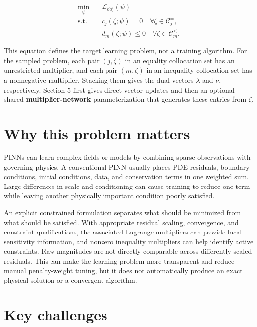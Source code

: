 \documentclass[a4paper]{article}
\begin{document}
\begin{equation}
\begin{aligned}
\min_{\psi}\quad
&\mathcal L_{\mathrm{obj}}(\psi)\\
\mathrm{s.t.}\quad
&c_j(\zeta;\psi)=0
\quad \forall\zeta\in\mathcal C_j^{=},\\
&d_m(\zeta;\psi)\le0
\quad \forall\zeta\in\mathcal C_m^{\le}.
\end{aligned}
\end{equation}

This equation defines the target learning problem, not a training algorithm.
For the sampled problem, each pair $(j,\zeta)$ in an equality collocation set
has an unrestricted multiplier, and each pair $(m,\zeta)$ in an inequality
collocation set has a nonnegative multiplier. Stacking them gives the dual
vectors $\lambda$ and $\nu$, respectively. Section 5 first gives direct vector
updates and then an optional shared \textbf{multiplier-network} parameterization
that generates these entries from $\zeta$.

\section{Why this problem matters}

PINNs can learn complex fields or models by combining sparse observations
with governing physics. A conventional PINN usually places PDE residuals,
boundary conditions, initial conditions, data, and conservation terms in one
weighted sum. Large differences in scale and conditioning can cause training
to reduce one term while leaving another physically important condition
poorly satisfied.

An explicit constrained formulation separates what should be minimized from
what should be satisfied. With appropriate residual scaling, convergence, and
constraint qualifications, the associated Lagrange multipliers can provide
local sensitivity information, and nonzero inequality multipliers can help
identify active constraints. Raw magnitudes are not directly comparable
across differently scaled residuals. This can make the learning problem more
transparent and reduce manual penalty-weight tuning, but it does not
automatically produce an exact physical solution or a convergent algorithm.

\section{Key challenges}
\end{document}
